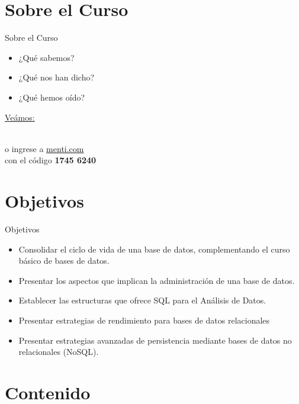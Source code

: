 \documentclass{beamer}
\begin{document}
\section{Sobre el Curso}

\begin{frame}{Sobre el Curso}
\begin{itemize}
    \item ¿Qué sabemos?
    \item ¿Qué nos han dicho?
    \item ¿Qué hemos oído?
\end{itemize}

    \centering
    \vspace{10mm}
    {\small \href{https://www.mentimeter.com/app/presentation/alfaisiivs1g37v36evz9fa49zpqobru/edit?question=wgh3ewvzk1pe}{Veámos:}}\\
    \vspace{2mm}
  
    \\
    \vspace{2mm}
    \footnotesize  o ingrese a \href{https://www.menti.com/}{menti.com}\\ con el código \textbf{1745 6240}
\end{frame}

\section{Objetivos}

\begin{frame}{Objetivos}
\begin{itemize}
    \item Consolidar el ciclo de vida de una base de datos, complementando el curso básico de bases de datos.
    \item Presentar los aspectos que implican la administración de una base de datos.
    \item Establecer las estructuras que ofrece SQL para el Análisis de Datos.
    \item Presentar estrategias de rendimiento para bases de datos relacionales
    \item Presentar estrategias avanzadas de persistencia mediante bases de datos no relacionales (NoSQL).
\end{itemize}
\end{frame}

\section{Contenido}
\end{document}
